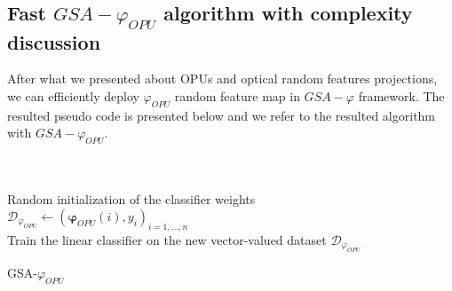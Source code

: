 \subsection{Fast $GSA-\varphi_{OPU}$ algorithm with complexity discussion}
After what we presented about OPUs and optical random features projections, we can efficiently deploy $\varphi_{OPU}$ random feature map in $GSA-\varphi$ framework. The resulted pseudo code is presented below and we refer to the resulted algorithm with $GSA-\varphi_{OPU}$. \newline\newline
\begin{algorithm}[H]
\DontPrintSemicolon
  \\
  \\
  \Algo{\\}
  Random initialization of the classifier weights\\
  $\mathcal{D}_{\varphi_{OPU}}\gets (\boldsymbol{\varphi}_{OPU}(i),y_i)_{i=1,\ldots, n}$\\
  Train the linear classifier on the new vector-valued dataset $\mathcal{D}_{\varphi_{OPU}}$
\caption{GSA-$\varphi_{OPU}$}
\end{algorithm}

